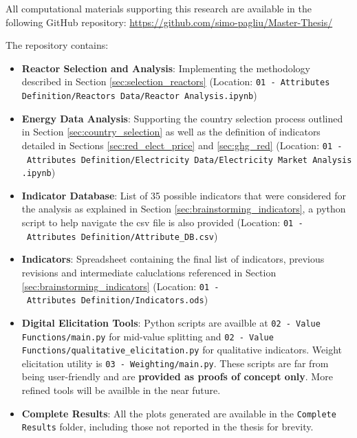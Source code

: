 \label{sec:appendix_code}

All computational materials supporting this research are available in the following GitHub repository:
\url{https://github.com/simo-pagliu/Master-Thesis/}

The repository contains:
\begin{itemize}
    \item \textbf{Reactor Selection and Analysis}: Implementing the methodology described in Section \ref{sec:selection_reactors} (Location: \nolinkurl{01 - Attributes Definition/Reactors Data/Reactor Analysis.ipynb})
    \item \textbf{Energy Data Analysis}: Supporting the country selection process outlined in Section \ref{sec:country_selection} as well as the definition of indicators detailed in Sections \ref{sec:red_elect_price} and \ref{sec:ghg_red} (Location: \texttt{01\ -\ Attributes\ Definition/Electricity\ Data/Electricity\ Market\ Analysis.ipynb})
    \item \textbf{Indicator Database}: List of 35 possible indicators that were considered for the analysis as explained in Section \ref{sec:brainstorming_indicators}, a python script to help navigate the csv file is also provided (Location: \texttt{01\ -\ Attributes\ Definition/Attribute\_DB.csv})
    \item \textbf{Indicators}: Spreadsheet containing the final list of indicators, previous revisions and intermediate caluclations referenced in Section \ref{sec:brainstorming_indicators} (Location: \texttt{01\ -\ Attributes\ Definition/Indicators.ods})
    \item \textbf{Digital Elicitation Tools}: Python scripts are availble at \nolinkurl{02 - Value Functions/main.py} for mid-value splitting and \nolinkurl{02 - Value Functions/qualitative_elicitation.py} for qualitative indicators. Weight elicitation utility is \nolinkurl{03 - Weighting/main.py}. These scripts are far from being user-friendly and are \textbf{provided as proofs of concept only}. More refined tools will be availble in the near future.
    \item \textbf{Complete Results}: All the plots generated are available in the \nolinkurl{Complete Results} folder, including those not reported in the thesis for brevity.
\end{itemize}